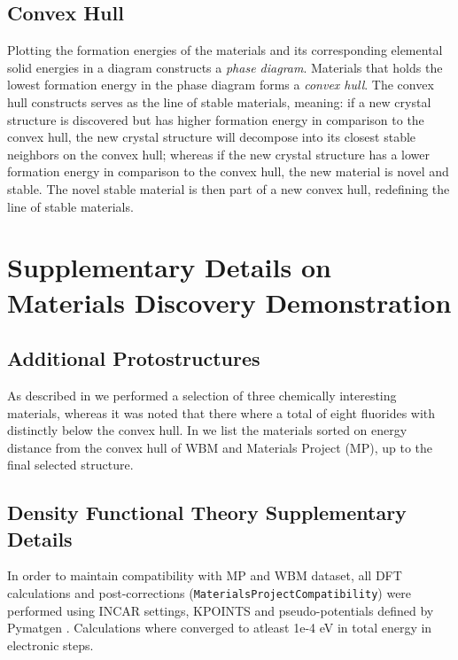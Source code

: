 \subsection{Convex Hull}
\label{app:convex_hull}
Plotting the formation energies of the materials and its corresponding elemental solid energies in a diagram constructs a \textit{phase diagram}. Materials that holds the lowest formation energy in the phase diagram forms a \textit{convex hull}. The convex hull constructs serves as the line of stable materials, meaning: if a new crystal structure is discovered but has higher formation energy in comparison to the convex hull, the new crystal structure will decompose into its closest stable neighbors on the convex hull; whereas if the new crystal structure has a lower formation energy in comparison to the convex hull, the new material is novel and stable. The novel stable material is then part of a new convex hull, redefining the line of stable materials.


\section{Supplementary Details on Materials Discovery Demonstration}
\label{app:materials-discovery-details}


\subsection{Additional Protostructures}
\label{app:additional-protostructures}
As described in  we performed a selection of three chemically interesting materials, whereas it was noted that there where a total of eight fluorides with distinctly below the convex hull. In  we list the materials sorted on energy distance from the convex hull of WBM and Materials Project (MP), up to the final selected structure. 



\subsection{Density Functional Theory Supplementary Details}
\label{app:dft-supplementary}
 In order to maintain compatibility with MP and WBM dataset, all DFT calculations and post-corrections (\texttt{MaterialsProjectCompatibility}) \cite{jainFormationEnthalpiesMixing2011a} were performed using INCAR settings, KPOINTS and pseudo-potentials defined by Pymatgen \cite{Ong2013}. Calculations where converged to atleast 1e-4 eV in total energy in electronic steps.


